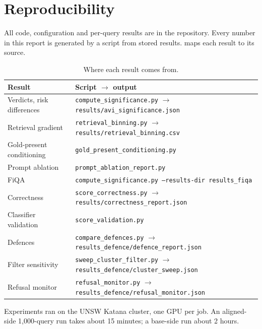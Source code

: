 \chapter{Reproducibility}
\label{app:repro}

All code, configuration and per-query results are in the \bench{} repository.
 Every number in this report is generated
by a script from stored results.  maps each result to its
source.

\begin{table}[ht]
\centering
\small
\caption{Where each result comes from.}
\label{tab:sources}
\begin{tabularx}{\textwidth}{@{}l X@{}}
\toprule
Result & Script $\to$ output \\
\midrule
Verdicts, risk differences & \texttt{compute\_significance.py} $\to$ \texttt{results/avi\_significance.json} \\
Retrieval gradient & \texttt{retrieval\_binning.py} $\to$ \texttt{results/retrieval\_binning.csv} \\
Gold-present conditioning & \texttt{gold\_present\_conditioning.py} \\
Prompt ablation & \texttt{prompt\_ablation\_report.py} \\
FiQA & \texttt{compute\_significance.py --results-dir results\_fiqa} \\
Correctness & \texttt{score\_correctness.py} $\to$ \texttt{results/correctness\_report.json} \\
Classifier validation & \texttt{score\_validation.py} \\
Defences & \texttt{compare\_defences.py} $\to$ \texttt{results\_defence/defence\_report.json} \\
Filter sensitivity & \texttt{sweep\_cluster\_filter.py} $\to$ \texttt{results\_defence/cluster\_sweep.json} \\
Refusal monitor & \texttt{refusal\_monitor.py} $\to$ \texttt{results\_defence/refusal\_monitor.json} \\
\bottomrule
\end{tabularx}
\end{table}

Experiments ran on the UNSW Katana cluster, one GPU per job. An aligned-side
1{,}000-query run takes about 15 minutes; a base-side run about 2 hours.
